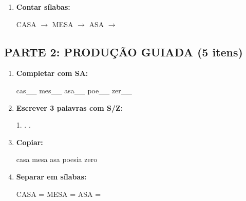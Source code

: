 \begin{exercicio}
\begin{enumerate}
  \item \textbf{Contar sílabas:}
  \begin{center}
  CASA $\rightarrow$ \underline{\hspace{0.9cm}} \quad MESA $\rightarrow$ \underline{\hspace{0.9cm}} \quad ASA $\rightarrow$ \underline{\hspace{0.9cm}}
  \end{center}

\end{enumerate}

\subsection*{PARTE 2: PRODUÇÃO GUIADA (5 itens)}

\begin{enumerate}[resume]

  \item \textbf{Completar com SA:}
  \begin{center}
  cas\underline{~~~} \quad mes\underline{~~~} \quad asa\underline{~~~} \quad poe\underline{~~~} \quad zer\underline{~~~}
  \end{center}

  \item \textbf{Escrever 3 palavras com S/Z:}
  \begin{center}
  1. \underline{\hspace{3cm}} . \underline{\hspace{3cm}} . \underline{\hspace{3cm}}
  \end{center}

  \item \textbf{Copiar:}
  \begin{center}
  casa \quad mesa \quad asa \quad poesia \quad zero
  \end{center}

  \item \textbf{Separar em sílabas:}
  \begin{center}
  CASA = \underline{\hspace{1cm}} \underline{\hspace{1cm}} \quad MESA = \underline{\hspace{1cm}} \underline{\hspace{1cm}} \quad ASA = \underline{\hspace{1cm}} \underline{\hspace{1cm}}
  \end{center}


\end{enumerate}
\end{exercicio}
